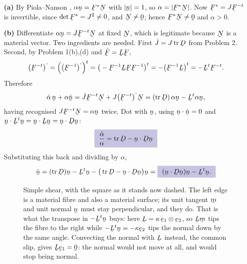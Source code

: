 \begin{solution}
\textbf{(a)} By Piola--Nanson , $\alpha\bn=\bF^{*}\bN$ with
$|\bn|=1$, so $\alpha=|\bF^{*}\bN|$. Now $\bF^{*}=J\bF^{-t}$ is
invertible, since $\det\bF^{*}=J^{2}\neq0$, and $\bN\neq\bze$; hence
$\bF^{*}\bN\neq\bze$ and $\alpha>0$.

\textbf{(b)} Differentiate $\alpha\bn=J\bF^{-t}\bN$ at fixed $\bN$, which
is legitimate because $\bN$ is a material vector. Two ingredients are
needed. First $\dot J=J\tr\bD$ from Problem 2. Second, by Problem 1(b),(d)
and $\dot\bF=\bL\bF$,
\[
   \big(\bF^{-t}\big)^{\textstyle\cdot}
   =\Big(\big(\bF^{-1}\big)^{\textstyle\cdot}\Big)^{t}
   =\big(-\bF^{-1}\bL\bF\bF^{-1}\big)^{t}
   =-\big(\bF^{-1}\bL\big)^{t}
   =-\bL^{t}\bF^{-t}.
\]
Therefore
\[
   \dot\alpha\,\bn+\alpha\dot\bn
   =\dot J\bF^{-t}\bN+J\big(\bF^{-t}\big)^{\textstyle\cdot}\bN
   =(\tr\bD)\,\alpha\bn-\bL^{t}\alpha\bn ,
\]
having recognised $J\bF^{-t}\bN=\alpha\bn$ twice. Dot with $\bn$, using
$\ip{\bn}{\dot\bn}=0$ and
$\ip{\bn}{\bL^{t}\bn}=\ip{\bn}{\bL\bn}=\ip\bn{\bD\bn}$:
\[
   \boxed{\ \frac{\dot\alpha}{\alpha}=\tr\bD-\ip\bn{\bD\bn}\ }
\]
Substituting this back and dividing by $\alpha$,
\[
   \dot\bn=(\tr\bD)\bn-\bL^{t}\bn-\big(\tr\bD-\ip\bn{\bD\bn}\big)\bn
   =\boxed{\ (\ip\bn{\bD\bn})\bn-\bL^{t}\bn .\ }
\]
\begin{figure}[htbp]\centering
\renewcommand{\thefigure}{E}
\caption{Simple shear, with the square as it stands now dashed. The left
edge is a material fibre and also a material surface; its unit tangent
$\bm$ and unit normal $\bn$ must stay perpendicular, and they do. That is
what the transpose in $-\bL^{t}\bn$ buys: here
$\bL=\kappa\,\be_{1}\otimes\be_{2}$, so $\bL\bm$ tips the fibre to the
right while $-\bL^{t}\bn=-\kappa\be_{2}$ tips the normal down by the same
angle. Convecting the normal with $\bL$ instead, the common slip, gives
$\bL\be_{1}=\bze$: the normal would not move at all, and would stop being
normal.}
\label{fig:linevsnormal}
\end{figure}


\end{solution}
